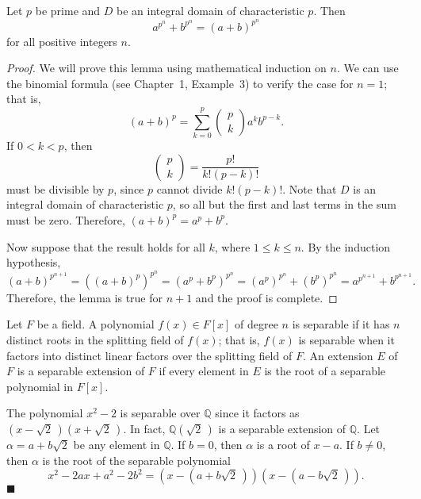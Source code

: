 \begin{lemma}
Let $p$ be prime and $D$ be an integral domain of characteristic $p$.  Then
$$
a^{p^n} + b^{p^n} = (a + b)^{p^n}
$$
for all positive integers $n$.  
\end{lemma}


\begin{proof}
We will prove this lemma using mathematical induction on $n$.  We can use the binomial formula (see Chapter~1, Example~3) to verify the case for $n = 1$; that is,
$$
(a+b)^p 
= 
\sum_{k=0}^{p} 
\left( \begin{array}{c} p \\ k \end{array} \right)
a^k b^{p-k}.
$$
If $0 < k < p$, then
$$
\left( \begin{array}{c} p \\ k \end{array} \right) =
\frac{p!}{k!(p-k)!}
$$
must be divisible by $p$, since $p$ cannot divide $k!(p - k)!$.  Note that $D$ is an integral domain of characteristic $p$, so all but the first and last terms in the sum must be zero.  Therefore, $(a + b)^p =
a^p + b^p$.  


Now suppose that the result holds for all $k$, where $1 \leq k \leq n$.  By the induction hypothesis,
$$
(a + b)^{p^{n + 1}}
=
((a + b)^p)^{p^{n}}
=
(a^p + b^p)^{p^{n}}
=
(a^p)^{p^{n}} + (b^p)^{p^{n}}
=
a^{p^{n + 1}} + b^{p^{n + 1}}.
$$
Therefore, the lemma is true for $n + 1$ and the proof is complete.
\end{proof}

\medskip

Let $F$ be a field.  A polynomial $f(x) \in F[x]$ of degree $n$ is {\bfi separable\/} if it has $n$ distinct roots in the splitting field of $f(x)$; that is, $f(x)$ is separable when it factors into distinct linear factors over the splitting field of $F$.  An extension $E$ of $F$ is a {\bfi separable extension\/} of $F$ if every element in $E$ is the root of a separable polynomial in $F[x]$.   

\medskip

The polynomial $x^2 - 2$ is separable over ${\mathbb Q}$ since it factors as $(x - \sqrt{2}\, )(x + \sqrt{2}\, )$. In fact, ${\mathbb Q}(\sqrt{2}\, )$ is a separable extension of ${\mathbb Q}$.  Let $\alpha =  a + b \sqrt{2}$ be any element in ${\mathbb Q}$. If $b = 0$, then $\alpha$ is a root of $x - a$.  If $b \neq 0$, then $\alpha$ is the root  of the separable polynomial 
$$
x^2 - 2 a x + a^2 - 2 b^2 = (x - (a + b \sqrt{2}\, ))(x - (a - b \sqrt{2}\, )).
$$
\hspace{\fill} $\blacksquare$
 
